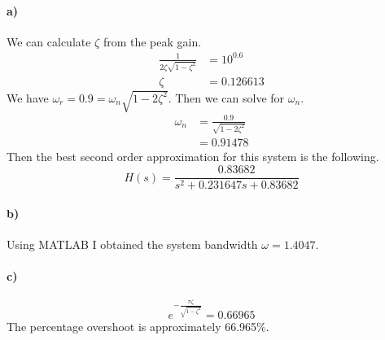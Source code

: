 \documentclass[12pt]{article}
\begin{document}
\paragraph{a)}

We can calculate \(\zeta\) from the peak gain.
\begin{align*}
    \frac{1}{2\zeta\sqrt{1-\zeta^2}}&=10^{0.6}\\
    \zeta&=0.126613
\end{align*}
We have \(\omega_r=0.9=\omega_n\sqrt{1-2\zeta^2}\). Then we can solve for \(\omega_n\).
\begin{align*}
    \omega_n&=\frac{0.9}{\sqrt{1-2\zeta^2}}\\
    &=0.91478
\end{align*}
Then the best second order approximation for this system is the following.
\[H(s)=\frac{0.83682}{s^2+0.231647s+0.83682}\]

\paragraph{b)}

Using MATLAB I obtained the system bandwidth \(\omega=1.4047\).

\paragraph{c)}

\[e^{-\frac{\pi\zeta}{\sqrt{1-\zeta^2}}}=0.66965\]
The percentage overshoot is approximately 66.965\%.
\end{document}
